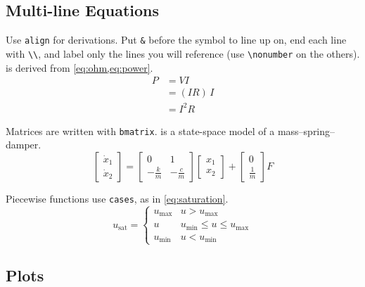 \subsection{Multi-line Equations}

Use \verb|align| for derivations. Put \verb|&| before the symbol to line up
on, end each line with \verb|\\|, and label only the lines you will
reference (use \verb|\nonumber| on the others).  is
derived from \cref{eq:ohm,eq:power}.
\begin{align}
    P &= VI \nonumber \\
      &= (IR)\,I \nonumber \\
      &= I^2 R \label{eq:power-final}
\end{align}

Matrices are written with \verb|bmatrix|.  is a
state-space model of a mass--spring--damper.
\begin{equation}
    \begin{bmatrix} \dot{x}_1 \\ \dot{x}_2 \end{bmatrix}
    =
    \begin{bmatrix} 0 & 1 \\ -\frac{k}{m} & -\frac{c}{m} \end{bmatrix}
    \begin{bmatrix} x_1 \\ x_2 \end{bmatrix}
    +
    \begin{bmatrix} 0 \\ \frac{1}{m} \end{bmatrix} F
    \label{eq:state-space}
\end{equation}

Piecewise functions use \verb|cases|, as in \cref{eq:saturation}.
\begin{equation}
    u_\text{sat} =
    \begin{cases}
        u_\text{max} & u > u_\text{max} \\
        u            & u_\text{min} \le u \le u_\text{max} \\
        u_\text{min} & u < u_\text{min}
    \end{cases}
    \label{eq:saturation}
\end{equation}

\subsection{Plots}

